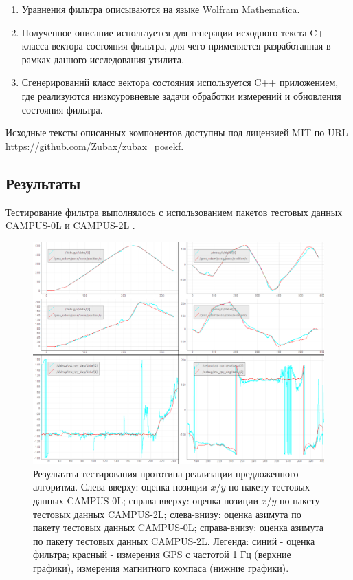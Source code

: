 \documentclass[12pt,a4paper]{article}
\begin{document}
\begin{enumerate}
    \item Уравнения фильтра описываются на языке Wolfram Mathematica.
    \item Полученное описание используется для генерации исходного текста C++ класса вектора состояния фильтра, для чего применяется разработанная в рамках данного исследования утилита.
    \item Сгенерированнй класс вектора состояния используется C++ приложением, где реализуются низкоуровневые задачи обработки измерений и обновления состояния фильтра.
\end{enumerate}

Исходные тексты описанных компонентов доступны под лицензией MIT по URL \url{https://github.com/Zubax/zubax_posekf}.

\subsection{Результаты}

Тестирование фильтра выполнялось с использованием пакетов тестовых данных CAMPUS-0L и CAMPUS-2L \cite{blanco2009cor}.

\begin{figure}[!htbp]
    \centering
    \includegraphics[width=\textwidth]{posekf_malaga.png}
    \caption{Результаты тестирования прототипа реализации предложенного алгоритма. Слева-вверху: оценка позиции $x$/$y$ по пакету тестовых данных CAMPUS-0L; справа-вверху: оценка позиции $x$/$y$ по пакету тестовых данных CAMPUS-2L; слева-внизу: оценка азимута по пакету тестовых данных CAMPUS-0L; справа-внизу: оценка азимута по пакету тестовых данных CAMPUS-2L. Легенда: синий - оценка фильтра; красный - измерения GPS с частотой 1 Гц (верхние графики), измерения магнитного компаса (нижние графики).}
\end{figure}
\end{document}
